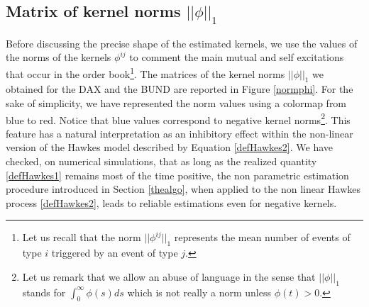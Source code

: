 \documentclass[a4paper,11pt]{article}
\newcommand{\PB}{P^{(b)}}
\newcommand{\TA}{T^{(a)}}
\newcommand{\TB}{T^{(b)}}
\newcommand{\CA}{C^{(a)}}
\newcommand{\CB}{C^{(b)}}
\newcommand{\LA}{L^{(a)}}
\newcommand{\LB}{L^{(b)}}
\begin{document}
\subsection{Matrix of kernel norms $||\phi||_1$}
Before discussing the precise shape of the estimated kernels, we use the values of the norms of the kernels $\phi^{ij}$ to comment the main mutual and self excitations that occur in the order book\footnote{Let us recall that the norm $||\phi^{ij}||_1$ represents the mean number of events of type $i$ triggered by an event of type $j$.}.
The matrices of the kernel norms $||\phi||_1$ we obtained for the DAX and the BUND are reported in Figure \ref{normphi}.
For the sake of simplicity, we have represented the norm values using a colormap from blue to red. Notice that blue values correspond to negative kernel norms\footnote{Let us remark that we allow an abuse of language in the sense that $||\phi||_1$ stands for $\int_0^\infty \phi(s) ds$ which is not really a norm unless $\phi(t) > 0$.}.
This feature has a natural interpretation as an inhibitory
effect within the non-linear
version of the Hawkes model described by Equation \eqref{defHawkes2}.
We have checked, on numerical simulations, that as long as the realized quantity \eqref{defHawkes1} remains most of the time positive, the non parametric estimation procedure introduced in Section \ref{thealgo}, when applied to the non linear Hawkes process \eqref{defHawkes2}, leads to reliable estimations even for negative kernels.\\

\end{document}
